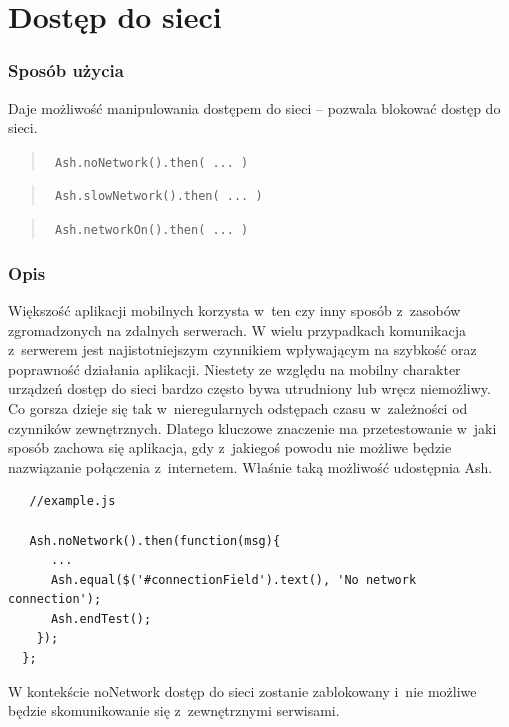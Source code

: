 \documentclass[brudnopis]{xmgr}
\begin{document}
\section{Dostęp do sieci}

\subsubsection{Sposób użycia}

Daje możliwość manipulowania dostępem do sieci -- pozwala blokować dostęp do sieci.

\begin{quote}
  \texttt{  Ash.noNetwork().then( ... )  } 
\end{quote}

\begin{quote}
  \texttt{  Ash.slowNetwork().then( ... )  }
\end{quote}

\begin{quote}
  \texttt{  Ash.networkOn().then( ... )  } 
\end{quote}

\subsubsection{Opis}

Większość aplikacji mobilnych korzysta w~ten czy inny sposób z~zasobów zgromadzonych na zdalnych serwerach. W wielu przypadkach komunikacja z~serwerem jest najistotniejszym czynnikiem wpływającym na szybkość oraz poprawność działania aplikacji. Niestety ze względu na mobilny charakter urządzeń dostęp do sieci bardzo często bywa utrudniony lub wręcz niemożliwy. Co gorsza dzieje się tak w~nieregularnych odstępach czasu w~zależności od czynników zewnętrznych. Dlatego kluczowe znaczenie ma przetestowanie w~jaki sposób zachowa się aplikacja, gdy z~jakiegoś powodu nie możliwe będzie nazwiązanie połączenia z~internetem. Właśnie taką możliwość udostępnia Ash. 

\begin{lstlisting}
   //example.js

   Ash.noNetwork().then(function(msg){
      ...
      Ash.equal($('#connectionField').text(), 'No network connection');
      Ash.endTest();
    });
  };
\end{lstlisting}

W kontekście noNetwork dostęp do sieci zostanie zablokowany i~nie możliwe będzie skomunikowanie się z~zewnętrznymi serwisami.
\end{document}
